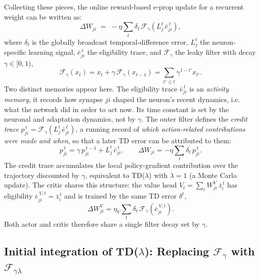 Collecting these pieces, the online reward-based e-prop update for a recurrent
weight can be written as:
%
\begin{equation}
\Delta W_{ji} \;=\; -\eta \sum_t \delta_t \,
\mathcal{F}_{\gamma}\!\left( L^t_j\, \bar{e}^{\,t}_{ji} \right),
\label{eq:eprop-standard}
\end{equation}
%
where $\delta_t$ is the globally broadcast temporal-difference error, $L^t_j$
the neuron-specific learning signal, $\bar{e}^{\,t}_{ji}$ the eligibility
trace, and $\mathcal{F}_{\gamma}$ the leaky filter with decay
$\gamma \in [0,1)$,
%
\begin{equation}
\mathcal{F}_{\gamma}\!\left( x_t \right)
= x_t + \gamma\, \mathcal{F}_{\gamma}\!\left( x_{t-1} \right)
= \sum_{t' \le t} \gamma^{\,t - t'} x_{t'} .
\label{eq:filter-def}
\end{equation}
%
Two distinct memories appear here. The eligibility trace
$\bar{e}^{\,t}_{ji}$ is an \emph{activity memory}, it records how synapse
$ji$ shaped the neuron's recent dynamics, i.e. what the network did in order
to act now. Its time constant is set by the neuronal and adaptation dynamics,
not by $\gamma$. The outer filter defines the \emph{credit trace}
$p^{\,t}_{ji} = \mathcal{F}_{\gamma}\!\left( L^t_j\, \bar{e}^{\,t}_{ji}
\right)$, a running record of \emph{which action-related contributions were
made and when}, so that a later TD error can be attributed to them:
%
\begin{equation}
p^{\,t}_{ji} = \gamma\, p^{\,t-1}_{ji} + L^t_j\, \bar{e}^{\,t}_{ji},
\qquad
\Delta W_{ji} = -\eta \sum_t \delta_t\, p^{\,t}_{ji}.
\label{eq:credit-trace}
\end{equation}
%
The credit trace accumulates the local
policy-gradient contribution over the trajectory discounted by $\gamma$,
equivalent to TD($\lambda$) with $\lambda = 1$ (a Monte Carlo update). The
critic shares this structure: the value head $V_t = \sum_i W^{V}_{ji}\,
\bar{z}^{\,t}_i$ has eligibility $\bar{e}^{\,V,t}_{ji} = \bar{z}^{\,t}_i$ and
is trained by the same TD error $\delta^t$,
%
\begin{equation}
\Delta W^{V}_{ji} = \eta_V \sum_t \delta_t\,
\mathcal{F}_{\gamma}\!\left( \bar{e}^{\,V,t}_{ji} \right).
\label{eq:value-standard}
\end{equation}
%
Both actor and critic therefore share a single filter decay set by $\gamma$.

\subsection{Initial integration of TD($\lambda$): Replacing $\mathcal{F}_{\gamma}$ with
$\mathcal{F}_{\gamma\lambda}$}
\label{sec:intro-tdlambda}

